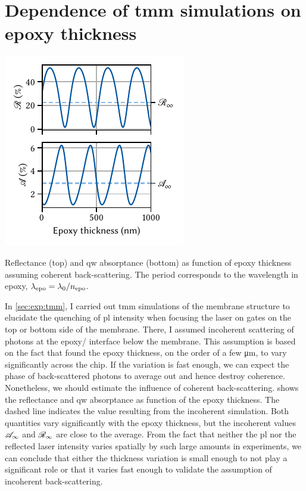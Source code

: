 \section{Dependence of \texorpdfstring{\acrshort{tmm}}{TMM} simulations on epoxy thickness}\label{sec:app:exp:tmm}
\begin{marginfigure}
    \centering
    \includegraphics{img/pdf/experiment/reflectance_epoxy}
    \caption[]{
        Reflectance (top) and \gls{qw} absorptance (bottom) as function of epoxy thickness assuming coherent back-scattering.
        The period corresponds to the wavelength in epoxy, $\lambda_{\mathrm{epo}} = \lambda_0/n_{\mathrm{epo}}$.
    }
    \label{fig:app:exp:tmm:epoxy}
\end{marginfigure}

In \cref{sec:exp:tmm}, I carried out \gls{tmm} simulations of the membrane structure to elucidate the quenching of \gls{pl} intensity when focusing the laser on gates on the top or bottom side of the membrane.
There, I assumed incoherent scattering of photons at the epoxy/ interface below the membrane.
This assumption is based on the fact that \citet{Descamps2021} found the epoxy thickness, on the order of a few \unit{\micro\meter}, to vary significantly across the chip.
If the variation is fast enough, we can expect the phase of back-scattered photons to average out and hence destroy coherence.
Nonetheless, we should estimate the influence of coherent back-scattering.
 shows the reflectance  and \gls{qw} absorptance \absorptance as function of the epoxy thickness.
The dashed line indicates the value resulting from the incoherent simulation.
Both quantities vary significantly with the epoxy thickness, but the incoherent values $\mathscr{A}_\infty$ and $\mathscr{R}_\infty$ are close to the average.
From the fact that neither the \gls{pl} nor the reflected laser intensity varies spatially by such large amounts in experiments, we can conclude that either the thickness variation is small enough to not play a significant role or that it varies fast enough to validate the assumption of incoherent back-scattering.
